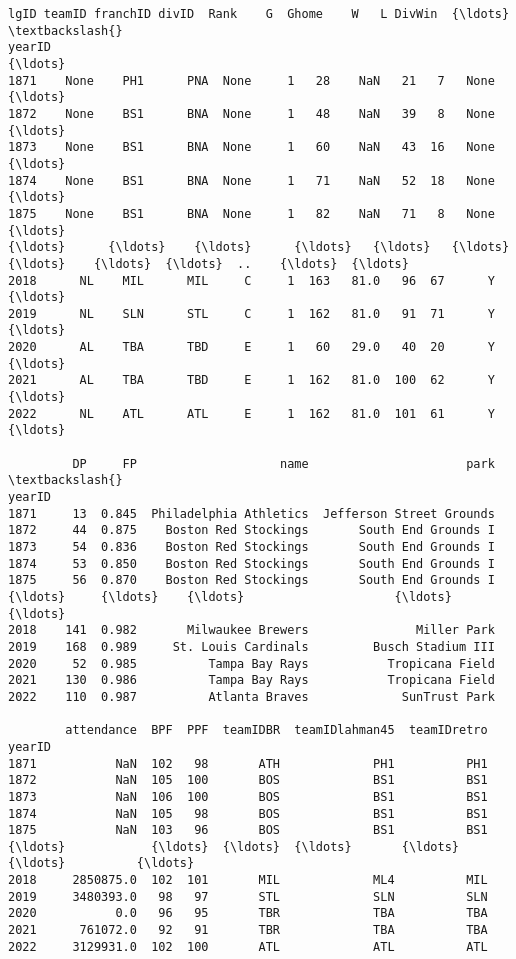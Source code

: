 \documentclass[11pt]{article}
\makeatletter
\newcommand{\boxspacing}{\kern\kvtcb@left@rule\kern\kvtcb@boxsep}
\newcommand{\prompt}[4]{
        {\ttfamily\llap{{\color{#2}[#3]:\hspace{3pt}#4}}\vspace{-\baselineskip}}
    }
\makeatother
\begin{document}
            \begin{tcolorbox}[breakable, size=fbox, boxrule=.5pt, pad at break*=1mm, opacityfill=0]
\prompt{Out}{outcolor}{16}{\boxspacing}
\begin{Verbatim}[commandchars=\\\{\}]
        lgID teamID franchID divID  Rank    G  Ghome    W   L DivWin  {\ldots}  \textbackslash{}
yearID                                                                {\ldots}
1871    None    PH1      PNA  None     1   28    NaN   21   7   None  {\ldots}
1872    None    BS1      BNA  None     1   48    NaN   39   8   None  {\ldots}
1873    None    BS1      BNA  None     1   60    NaN   43  16   None  {\ldots}
1874    None    BS1      BNA  None     1   71    NaN   52  18   None  {\ldots}
1875    None    BS1      BNA  None     1   82    NaN   71   8   None  {\ldots}
{\ldots}      {\ldots}    {\ldots}      {\ldots}   {\ldots}   {\ldots}  {\ldots}    {\ldots}  {\ldots}  ..    {\ldots}  {\ldots}
2018      NL    MIL      MIL     C     1  163   81.0   96  67      Y  {\ldots}
2019      NL    SLN      STL     C     1  162   81.0   91  71      Y  {\ldots}
2020      AL    TBA      TBD     E     1   60   29.0   40  20      Y  {\ldots}
2021      AL    TBA      TBD     E     1  162   81.0  100  62      Y  {\ldots}
2022      NL    ATL      ATL     E     1  162   81.0  101  61      Y  {\ldots}

         DP     FP                    name                      park  \textbackslash{}
yearID
1871     13  0.845  Philadelphia Athletics  Jefferson Street Grounds
1872     44  0.875    Boston Red Stockings       South End Grounds I
1873     54  0.836    Boston Red Stockings       South End Grounds I
1874     53  0.850    Boston Red Stockings       South End Grounds I
1875     56  0.870    Boston Red Stockings       South End Grounds I
{\ldots}     {\ldots}    {\ldots}                     {\ldots}                       {\ldots}
2018    141  0.982       Milwaukee Brewers               Miller Park
2019    168  0.989     St. Louis Cardinals         Busch Stadium III
2020     52  0.985          Tampa Bay Rays           Tropicana Field
2021    130  0.986          Tampa Bay Rays           Tropicana Field
2022    110  0.987          Atlanta Braves             SunTrust Park

        attendance  BPF  PPF  teamIDBR  teamIDlahman45  teamIDretro
yearID
1871           NaN  102   98       ATH             PH1          PH1
1872           NaN  105  100       BOS             BS1          BS1
1873           NaN  106  100       BOS             BS1          BS1
1874           NaN  105   98       BOS             BS1          BS1
1875           NaN  103   96       BOS             BS1          BS1
{\ldots}            {\ldots}  {\ldots}  {\ldots}       {\ldots}             {\ldots}          {\ldots}
2018     2850875.0  102  101       MIL             ML4          MIL
2019     3480393.0   98   97       STL             SLN          SLN
2020           0.0   96   95       TBR             TBA          TBA
2021      761072.0   92   91       TBR             TBA          TBA
2022     3129931.0  102  100       ATL             ATL          ATL


\end{Verbatim}
\end{tcolorbox}
\end{document}
